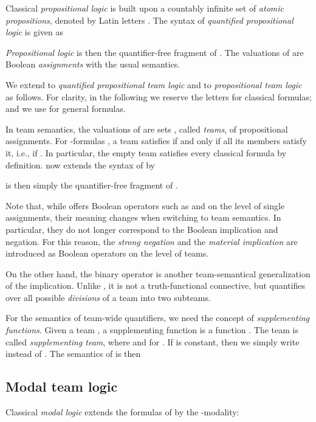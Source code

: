 \documentclass[a4paper,english,fleqn,11pt,final]{scrartcl}
\makeatletter
\newcommand{\ie}{i.e.\@\xspace}
\theoremstyle{plain}
\theoremstyle{definition}
\makeatother
\begin{document}
Classical \emph{propositional logic}  is built upon a countably infinite set  of \emph{atomic propositions}, denoted by Latin letters .
The syntax of \emph{quantified propositional logic}  is given as

\emph{Propositional logic}  is then the quantifier-free fragment of .
The valuations of  are Boolean \emph{assignments}  with the usual semantics.


\medskip

We extend  to \emph{quantified propositional team logic}  \cite{hannula_complexity_2015,gandalf} and  to \emph{propositional team logic}  \cite{yang_propositional_2017} as follows.
For clarity, in the following we reserve the letters  for classical formulas;
and we use  for general formulas.

In team semantics, the valuations of  are sets , called \emph{teams}, of propositional assignments.
For -formulas , a team  satisfies  if and only if all its members satisfy it, \ie,  if .
In particular, the empty team satisfies every classical formula by definition.
 now extends the syntax of  by

 is then simply the quantifier-free fragment of .

Note that, while  offers Boolean operators such as  and  on the level of single assignments, their meaning changes when switching to team semantics.
In particular, they do not longer correspond to the Boolean implication and negation.
For this reason, the \emph{strong negation}  and the \emph{material implication}  are introduced as Boolean operators on the level of teams.

On the other hand, the binary operator  is another team-semantical generalization of the implication.
Unlike , it is not a truth-functional connective, but quantifies over all possible \emph{divisions} of a team into two subteams.

For the semantics of team-wide quantifiers, we need the concept of \emph{supplementing functions}.
Given a team , a supplementing function is a function .
The team  is called \emph{supplementing team},
where  and  for .
If  is constant, then we simply write  instead of .
\label{p:semantics}
The semantics of  is then


\subsection{Modal team logic}

Classical \emph{modal logic}  extends the formulas of  by the -modality:
\end{document}
